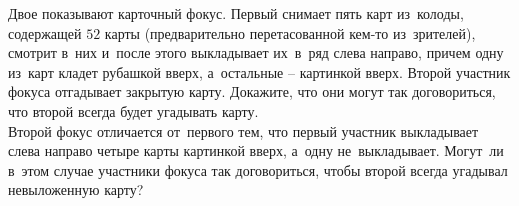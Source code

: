 \begin{problems}
\item
\sp
Двое показывают карточный фокус.
Первый снимает пять карт из~колоды, содержащей $52$ карты (предварительно
перетасованной кем-то из~зрителей), смотрит в~них и~после этого выкладывает
их~в~ряд слева направо, причем одну из~карт кладет рубашкой вверх, а~остальные
– картинкой вверх.
Второй участник фокуса отгадывает закрытую карту.
Докажите, что они могут так договориться, что второй всегда будет угадывать
карту.
\\
\sp
Второй фокус отличается от~первого тем, что первый участник выкладывает слева
направо четыре карты картинкой вверх, а~одну не~выкладывает.
Могут~ли в~этом случае участники фокуса так договориться, чтобы второй всегда
угадывал невыложенную карту?

\end{problems}

